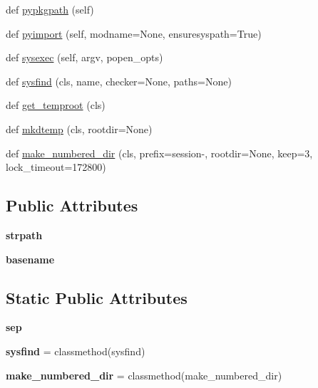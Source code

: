 \begin{DoxyCompactItemize}
def \hyperlink{classpy_1_1__path_1_1local_1_1_local_path_ae5c00220136db5d72de6a9a282f6a8a6}{pypkgpath} (self)
\item 
def \hyperlink{classpy_1_1__path_1_1local_1_1_local_path_a11890707d68a8a40601711a5809411e8}{pyimport} (self, modname=None, ensuresyspath=True)
\item 
def \hyperlink{classpy_1_1__path_1_1local_1_1_local_path_a06b81c811303619ce05c4ab93a11e686}{sysexec} (self, argv, popen\+\_\+opts)
\item 
def \hyperlink{classpy_1_1__path_1_1local_1_1_local_path_a97eccf10d053e1a47acf4f64e9301406}{sysfind} (cls, name, checker=None, paths=None)
\item 
def \hyperlink{classpy_1_1__path_1_1local_1_1_local_path_a1f84a58257ba76b82c73f389b83aad75}{get\+\_\+temproot} (cls)
\item 
def \hyperlink{classpy_1_1__path_1_1local_1_1_local_path_a828273172c32f44027e6b86fce674da3}{mkdtemp} (cls, rootdir=None)
\item 
def \hyperlink{classpy_1_1__path_1_1local_1_1_local_path_a5d7ec5e02caaf212229085e2a0129b97}{make\+\_\+numbered\+\_\+dir} (cls, prefix=\textquotesingle{}session-\/\textquotesingle{}, rootdir=None, keep=3, lock\+\_\+timeout=172800)
\end{DoxyCompactItemize}
\subsection*{Public Attributes}
\begin{DoxyCompactItemize}
\item 
\mbox{\label{classpy_1_1__path_1_1local_1_1_local_path_a90b7a1d6b2502acc16c448b18f43787c}} 
{\bfseries strpath}
\item 
\mbox{\label{classpy_1_1__path_1_1local_1_1_local_path_a6ef5327fff5167e98142149501ca0497}} 
{\bfseries basename}
\end{DoxyCompactItemize}
\subsection*{Static Public Attributes}
\begin{DoxyCompactItemize}
\item 
\mbox{\label{classpy_1_1__path_1_1local_1_1_local_path_abb1dbce2a97e684427f7be8345d4b5b1}} 
{\bfseries sep}
\item 
\mbox{\label{classpy_1_1__path_1_1local_1_1_local_path_aaa6719945732d6984508215a2355cc1a}} 
{\bfseries sysfind} = classmethod(sysfind)
\item 
\mbox{\label{classpy_1_1__path_1_1local_1_1_local_path_af3bc6aea64df2cec089ba7717411a6fe}} 
{\bfseries make\+\_\+numbered\+\_\+dir} = classmethod(make\+\_\+numbered\+\_\+dir)
\end{DoxyCompactItemize}



